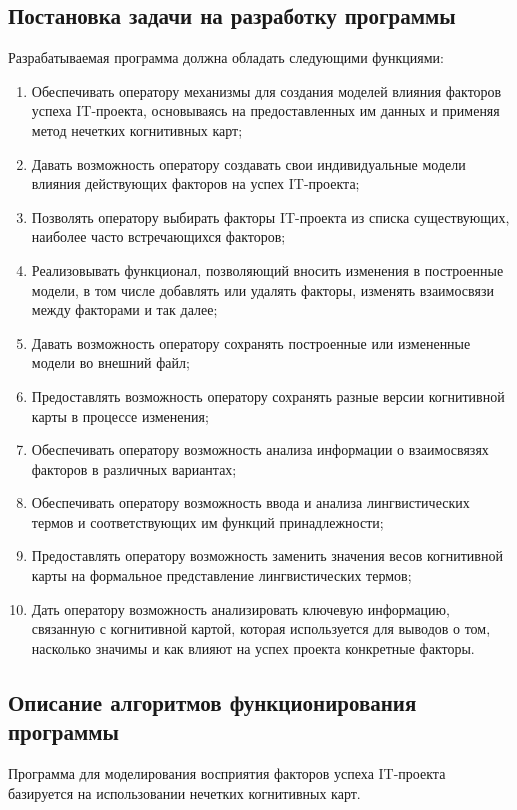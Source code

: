 \documentclass{article}
\begin{document}
    \subsection {Постановка задачи на разработку программы}
    Разрабатываемая программа должна обладать следующими функциями:
    \begin{enumerate}
        \item  Обеспечивать оператору механизмы для создания моделей влияния факторов успеха IT-проекта, основываясь на предоставленных им данных и применяя метод нечетких когнитивных карт;
        \item  Давать возможность оператору создавать свои индивидуальные модели влияния действующих факторов на успех IT-проекта;
        \item  Позволять оператору выбирать факторы IT-проекта из списка существующих, наиболее часто встречающихся факторов;
        \item  Реализовывать функционал, позволяющий вносить изменения в построенные модели, в том числе добавлять или удалять факторы, изменять взаимосвязи между факторами и так далее;
        \item  Давать возможность оператору сохранять построенные или измененные модели во внешний файл;
        \item  Предоставлять возможность оператору сохранять разные версии когнитивной карты в процессе изменения;
        \item  Обеспечивать оператору возможность анализа информации о взаимосвязях факторов в различных вариантах;
        \item  Обеспечивать оператору возможность ввода и анализа лингвистических термов и соответствующих им функций принадлежности;
        \item  Предоставлять оператору возможность заменить значения весов когнитивной карты на формальное представление лингвистических термов;
        \item  Дать оператору возможность анализировать ключевую информацию, связанную с когнитивной картой, которая используется для выводов о том, насколько значимы и как влияют на успех проекта конкретные факторы.
    \end{enumerate}

    \subsection{Описание алгоритмов функционирования программы}
    Программа для моделирования восприятия факторов успеха IT-проекта базируется на использовании нечетких когнитивных карт.
\end{document}
